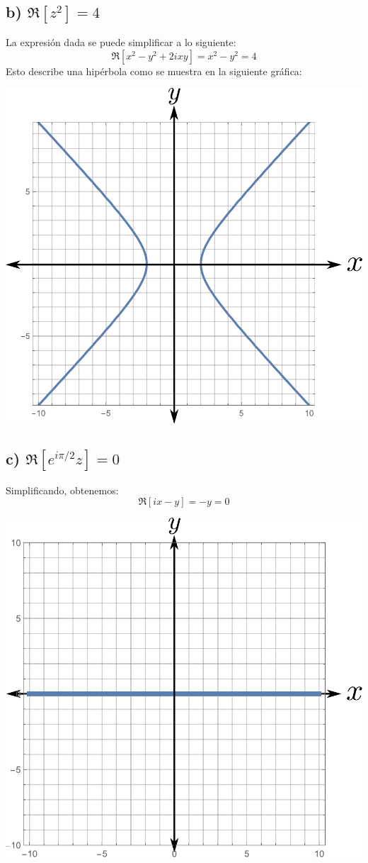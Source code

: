 \documentclass{article}
\begin{document}
\subsection*{b) $\Re[z^2]=4$}
La expresión dada se puede simplificar a lo siguiente:
$$\Re[x^2-y^2+2ixy]=x^2-y^2=4 $$ 
Esto describe una hipérbola como se muestra en la siguiente gráfica:
\begin{center}
\includegraphics[scale=0.5]{fig3.pdf}
\end{center}


\subsection*{c) $\Re[e^{i\pi/2}z]=0$}
Simplificando, obtenemos:
$$\Re[ix-y]=-y=0 $$
\begin{center}
\includegraphics[scale=0.5]{fig4.pdf}
\end{center}
\end{document}
